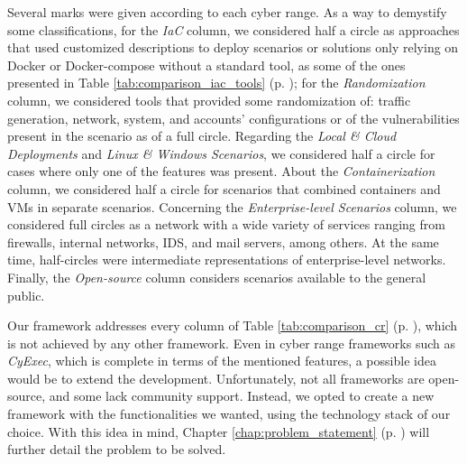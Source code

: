 Several marks were given according to each cyber range. As a way to demystify some classifications, for the \textit{IaC} column, we considered half a circle as approaches that used customized descriptions to deploy scenarios or solutions only relying on Docker or Docker-compose without a standard tool, as some of the ones presented in Table \ref{tab:comparison_iac_tools} (p. \pageref{tab:comparison_iac_tools}); for the \textit{Randomization} column, we considered tools that provided some randomization of: traffic generation, network, system, and accounts' configurations or of the vulnerabilities present in the scenario as of a full circle. Regarding the \textit{Local \& Cloud Deployments} and \textit{Linux \& Windows Scenarios}, we considered half a circle for cases where only one of the features was present. About the \textit{Containerization} column, we considered half a circle for scenarios that combined containers and VMs in separate scenarios. Concerning the \textit{Enterprise-level Scenarios} column, we considered full circles as a network with a wide variety of services ranging from firewalls, internal networks, IDS, and mail servers, among others. At the same time, half-circles were intermediate representations of enterprise-level networks. Finally, the \textit{Open-source} column considers scenarios available to the general public.

Our framework addresses every column of Table \ref{tab:comparison_cr} (p. \pageref{tab:comparison_cr}), which is not achieved by any other framework. Even in cyber range frameworks such as \textit{CyExec}, which is complete in terms of the mentioned features, a possible idea would be to extend the development. Unfortunately, not all frameworks are open-source, and some lack community support. Instead, we opted to create a new framework with the functionalities we wanted, using the technology stack of our choice. With this idea in mind, Chapter \ref{chap:problem_statement} (p. \pageref{chap:problem_statement}) will further detail the problem to be solved.